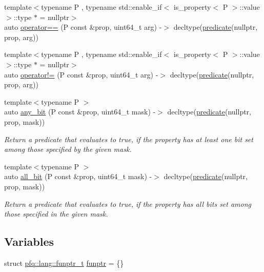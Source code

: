 \begin{DoxyCompactItemize}
\item 
{\footnotesize template$<$typename P , typename std\+::enable\+\_\+if$<$ is\+\_\+property$<$ P $>$\+::value $>$\+::type $\ast$  = nullptr$>$ }\\auto \hyperlink{namespacepfq_1_1lang_a87c8fa322873efdbddaa437f194b72b0}{operator==} (P const \&prop, uint64\+\_\+t arg) -\/$>$ decltype(\hyperlink{namespacepfq_1_1lang_aca9adafc436b7f851621b979fa1aaf88}{predicate}(nullptr, prop, arg))
\item 
{\footnotesize template$<$typename P , typename std\+::enable\+\_\+if$<$ is\+\_\+property$<$ P $>$\+::value $>$\+::type $\ast$  = nullptr$>$ }\\auto \hyperlink{namespacepfq_1_1lang_a4943eabefcfed4198394f42f913a14e8}{operator!=} (P const \&prop, uint64\+\_\+t arg) -\/$>$ decltype(\hyperlink{namespacepfq_1_1lang_aca9adafc436b7f851621b979fa1aaf88}{predicate}(nullptr, prop, arg))
\item 
{\footnotesize template$<$typename P $>$ }\\auto \hyperlink{namespacepfq_1_1lang_ac247c3827084d381d8518dabfff43bb2}{any\+\_\+bit} (P const \&prop, uint64\+\_\+t mask) -\/$>$ decltype(\hyperlink{namespacepfq_1_1lang_aca9adafc436b7f851621b979fa1aaf88}{predicate}(nullptr, prop, mask))
\begin{DoxyCompactList}\small\item\em Return a predicate that evaluates to {\ttfamily true}, if the property has at least one bit set among those specified by the given mask. \end{DoxyCompactList}\item 
{\footnotesize template$<$typename P $>$ }\\auto \hyperlink{namespacepfq_1_1lang_a62b1989f7b5d84549a99b1df46743bd6}{all\+\_\+bit} (P const \&prop, uint64\+\_\+t mask) -\/$>$ decltype(\hyperlink{namespacepfq_1_1lang_aca9adafc436b7f851621b979fa1aaf88}{predicate}(nullptr, prop, mask))
\begin{DoxyCompactList}\small\item\em Return a predicate that evaluates to {\ttfamily true}, if the property has all bits set among those specified in the given mask. \end{DoxyCompactList}\end{DoxyCompactItemize}
\subsection*{Variables}
\begin{DoxyCompactItemize}
\item 
struct \hyperlink{structpfq_1_1lang_1_1funptr__t}{pfq\+::lang\+::funptr\+\_\+t} \hyperlink{namespacepfq_1_1lang_a8d957b8f6df7198413d3ff9bd698e682}{funptr} = \{\}
\end{DoxyCompactItemize}


